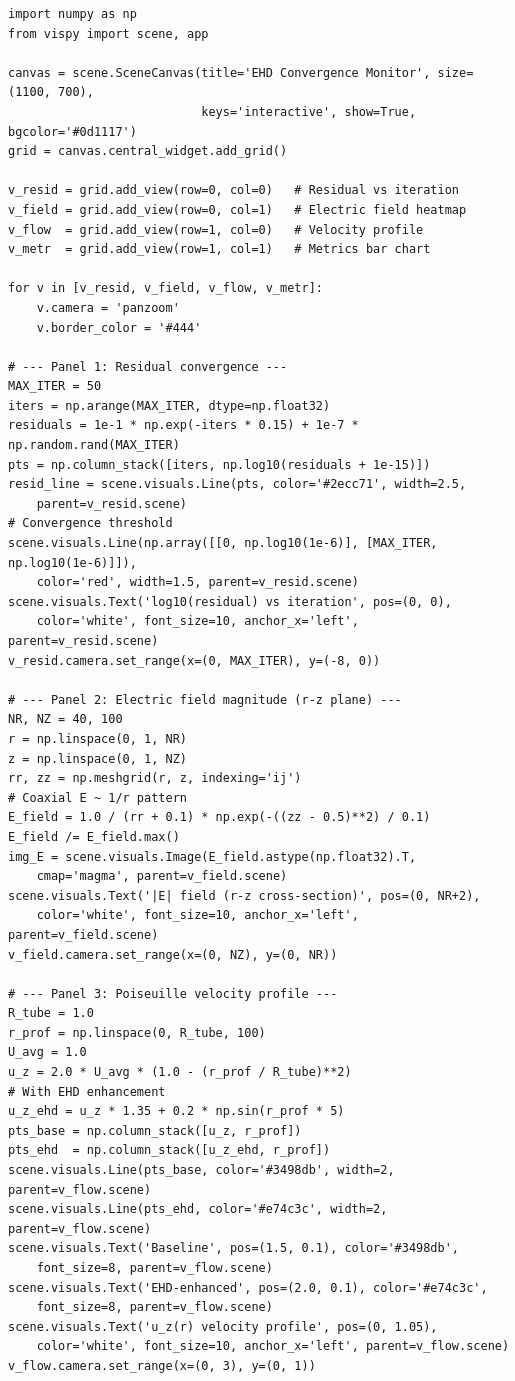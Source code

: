 \documentclass[11pt,a4paper]{article}
\begin{document}
\begin{lstlisting}[title={\textbf{Live EHD Steady-State Convergence Window}}]
import numpy as np
from vispy import scene, app

canvas = scene.SceneCanvas(title='EHD Convergence Monitor', size=(1100, 700),
                           keys='interactive', show=True, bgcolor='#0d1117')
grid = canvas.central_widget.add_grid()

v_resid = grid.add_view(row=0, col=0)   # Residual vs iteration
v_field = grid.add_view(row=0, col=1)   # Electric field heatmap
v_flow  = grid.add_view(row=1, col=0)   # Velocity profile
v_metr  = grid.add_view(row=1, col=1)   # Metrics bar chart

for v in [v_resid, v_field, v_flow, v_metr]:
    v.camera = 'panzoom'
    v.border_color = '#444'

# --- Panel 1: Residual convergence ---
MAX_ITER = 50
iters = np.arange(MAX_ITER, dtype=np.float32)
residuals = 1e-1 * np.exp(-iters * 0.15) + 1e-7 * np.random.rand(MAX_ITER)
pts = np.column_stack([iters, np.log10(residuals + 1e-15)])
resid_line = scene.visuals.Line(pts, color='#2ecc71', width=2.5,
    parent=v_resid.scene)
# Convergence threshold
scene.visuals.Line(np.array([[0, np.log10(1e-6)], [MAX_ITER, np.log10(1e-6)]]),
    color='red', width=1.5, parent=v_resid.scene)
scene.visuals.Text('log10(residual) vs iteration', pos=(0, 0),
    color='white', font_size=10, anchor_x='left', parent=v_resid.scene)
v_resid.camera.set_range(x=(0, MAX_ITER), y=(-8, 0))

# --- Panel 2: Electric field magnitude (r-z plane) ---
NR, NZ = 40, 100
r = np.linspace(0, 1, NR)
z = np.linspace(0, 1, NZ)
rr, zz = np.meshgrid(r, z, indexing='ij')
# Coaxial E ~ 1/r pattern
E_field = 1.0 / (rr + 0.1) * np.exp(-((zz - 0.5)**2) / 0.1)
E_field /= E_field.max()
img_E = scene.visuals.Image(E_field.astype(np.float32).T,
    cmap='magma', parent=v_field.scene)
scene.visuals.Text('|E| field (r-z cross-section)', pos=(0, NR+2),
    color='white', font_size=10, anchor_x='left', parent=v_field.scene)
v_field.camera.set_range(x=(0, NZ), y=(0, NR))

# --- Panel 3: Poiseuille velocity profile ---
R_tube = 1.0
r_prof = np.linspace(0, R_tube, 100)
U_avg = 1.0
u_z = 2.0 * U_avg * (1.0 - (r_prof / R_tube)**2)
# With EHD enhancement
u_z_ehd = u_z * 1.35 + 0.2 * np.sin(r_prof * 5)
pts_base = np.column_stack([u_z, r_prof])
pts_ehd  = np.column_stack([u_z_ehd, r_prof])
scene.visuals.Line(pts_base, color='#3498db', width=2, parent=v_flow.scene)
scene.visuals.Line(pts_ehd, color='#e74c3c', width=2, parent=v_flow.scene)
scene.visuals.Text('Baseline', pos=(1.5, 0.1), color='#3498db',
    font_size=8, parent=v_flow.scene)
scene.visuals.Text('EHD-enhanced', pos=(2.0, 0.1), color='#e74c3c',
    font_size=8, parent=v_flow.scene)
scene.visuals.Text('u_z(r) velocity profile', pos=(0, 1.05),
    color='white', font_size=10, anchor_x='left', parent=v_flow.scene)
v_flow.camera.set_range(x=(0, 3), y=(0, 1))


\end{lstlisting}
\end{document}
